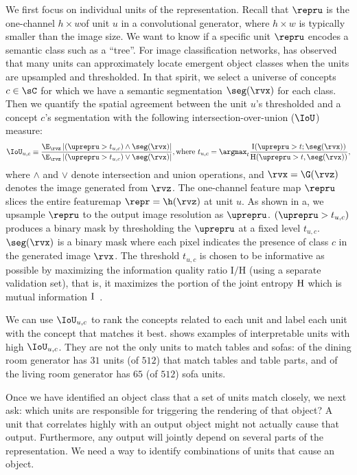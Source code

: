 \documentclass{article} %
\begin{document}
We first focus on individual units of the representation. Recall that $\repru$ is the one-channel $h\times w$\featuremap of unit $u$ in a convolutional generator, where $h\times w$ is typically smaller than the image size.
We want to know if a specific unit $\repru$ encodes a semantic class such as a ``tree''.  For image classification networks, \citet{bau2017network} has observed that many units can approximately locate emergent object classes when the units are upsampled and thresholded. In that spirit, we select a universe of concepts $c\in\sC$ for which we have a semantic segmentation $\seg(\rvx)$ for each class.  Then we quantify the spatial agreement between the unit $u$'s thresholded \featuremap and a concept $c$'s segmentation with the following intersection-over-union ($\IoU$) measure:
\begin{align}
\IoU_{u,c} \equiv
\frac{\E_{\rvz} \left|(\uprepru > t_{u,c}) \land  \seg(\rvx) \right|}
{\E_{\rvz} \left|(\uprepru > t_{u,c}) \vee \seg(\rvx) \right|}, 
\mbox{where } t_{u,c} = \argmax_{t} \frac{\text{I}(\uprepru > t ; \seg(\rvx))}{\text{H}(\uprepru > t , \seg(\rvx))},
\label{eq:max-iqr}
\end{align}
where $\land$ and $\vee$ denote intersection and union operations, and $\rvx=\G(\rvz)$ denotes the image generated from $\rvz$. The one-channel feature map $\repru$ slices the entire featuremap $\repr=\h(\rvz)$ at unit $u$. As shown in a, we upsample $\repru$ to the output image resolution as $\uprepru$. $(\uprepru > t_{u,c})$ produces a binary mask by thresholding the $\uprepru$  at a fixed level $t_{u,c}$.  
$\seg(\rvx)$ is a binary mask where each pixel indicates the presence of class $c$  in the generated image $\rvx$.
The threshold $t_{u,c}$ is chosen to be informative as possible by maximizing the information quality ratio $\text{I} / \text{H}$ (using a separate validation set), that is, it maximizes the portion of the joint entropy $\textnormal{H}$ which is mutual information $\textnormal{I}$~\citep{wijaya2017information}.


We can use $\IoU_{u,c}$ to rank the concepts related to each unit and label each unit with the concept that matches it best.  
 shows examples of interpretable units with high $\IoU_{u, c}$.
They are not the only units to match tables and sofas:  of the dining room generator has $31$ units (of $512$) that match tables and table parts, and  of the living room generator has $65$ (of $512$) sofa units.

Once we have identified an object class that a set of units match closely, we next ask: which units are responsible for triggering the rendering of that object?  A unit that correlates highly with an output object might not actually cause that output.  Furthermore, any output will jointly depend on several parts of the representation. We need a way to identify combinations of units that cause an object.
\end{document}
